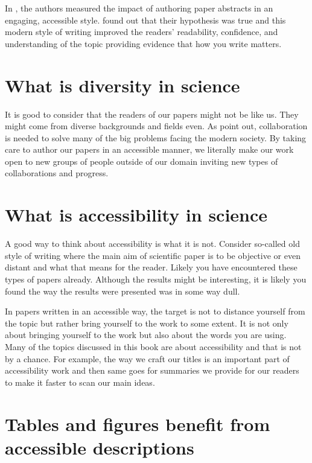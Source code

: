 In \citet{ryba2021better}, the authors measured the impact of authoring paper abstracts in an engaging, accessible style. \citet{ryba2021better} found out that their hypothesis was true and this modern style of writing improved the readers' readability, confidence, and understanding of the topic providing evidence that how you write matters.

\section{What is diversity in science}

It is good to consider that the readers of our papers might not be like us. They might come from diverse backgrounds and fields even.
As \citet{ryba2021better} point out, collaboration is needed to solve many of the big problems facing the modern society.
By taking care to author our papers in an accessible manner, we literally make our work open to new groups of people outside of our domain inviting new types of collaborations and progress.

\section{What is accessibility in science}

A good way to think about accessibility is what it is not.
Consider so-called old style of writing where the main aim of scientific paper is to be objective or even distant \citep{ryba2021better} and what that means for the reader.
Likely you have encountered these types of papers already.
Although the results might be interesting, it is likely you found the way the results were presented was in some way dull.

In papers written in an accessible way, the target is not to distance yourself from the topic but rather bring yourself to the work to some extent.
It is not only about bringing yourself to the work but also about the words you are using.
Many of the topics discussed in this book are about accessibility and that is not by a chance.
For example, the way we craft our titles is an important part of accessibility work and then same goes for summaries we provide for our readers to make it faster to scan our main ideas.

\section{Tables and figures benefit from accessible descriptions}

